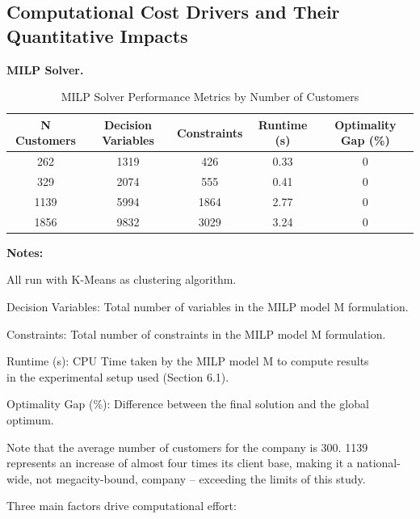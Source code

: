 \subsection{Computational Cost Drivers and Their Quantitative Impacts}  \label{app:computational:cost-drivers}

\textbf{MILP Solver.} 

\begin{table}[ht]
    \centering
    \caption{MILP Solver Performance Metrics by Number of Customers}
    \label{tab:milp_metrics_customers}
    \begin{tabular}{|c|c|c|c|c|}
        \hline
        \textbf{N Customers} & 
        \textbf{Decision Variables} & 
        \textbf{Constraints} & 
        \textbf{Runtime (s)} & 
        \textbf{Optimality Gap (\%)} \\
        \hline
        262  & 1319 & 426  & 0.33 & 0 \\
        \hline
        329  & 2074 & 555 & 0.41  & 0 \\
        \hline
        1139 & 5994 & 1864 & 2.77  & 0 \\
        \hline
        1856 & 9832 & 3029 & 3.24 & 0 \\
        \hline
    \end{tabular}
    \begin{tablenotes}
        \small
        \item \textbf{Notes:}
        \item All run with K-Means as clustering algorithm.
        \item Decision Variables: Total number of variables in the MILP model M formulation.
        \item Constraints: Total number of constraints in the MILP model M formulation.
        \item Runtime (s): CPU Time taken by the MILP model M to compute results \\ in the experimental setup used (Section 6.1).
        \item Optimality Gap (\%): Difference between the final solution and the global optimum. 
    \end{tablenotes}
\end{table}

Note that the average number of customers for the company is 300. 1139 represents an increase of almost four times its client base, making it a national-wide, not megacity-bound, company – exceeding the limits of this study.

Three main factors drive computational effort:

